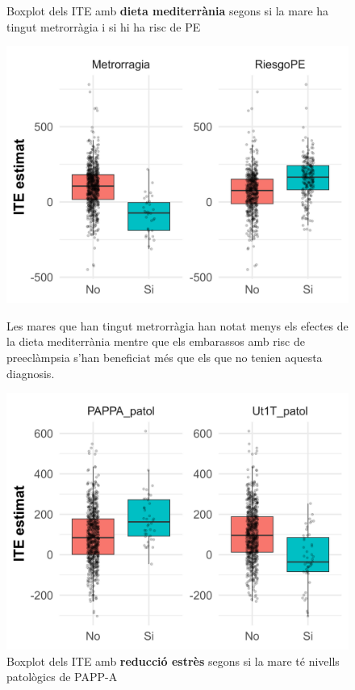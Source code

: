 \documentclass[../main.tex]{subfiles}
\begin{document}
    \begin{figure}[!htb]
      \centering
      \begin{minipage}[t]{0.48\textwidth}
        \captionsetup{font=small}
        \caption*{\centering Boxplot dels ITE amb \textbf{dieta mediterrània} segons si la mare ha tingut metrorràgia i si hi ha risc de PE}
        \includegraphics[width=\textwidth]{imgs/boxplots/boxplot_2_pes.jpg}
        \captionsetup{font=footnotesize}
        \caption{Les mares que han tingut metrorràgia han notat menys els efectes de la dieta mediterrània mentre que els embarassos amb risc de preeclàmpsia s'han beneficiat més que els que no tenien aquesta diagnosis.}
        \label{boxplot:pes2}
      \end{minipage}
      \hspace{0.01\textwidth}
      \begin{minipage}[t]{0.48\textwidth}
        \captionsetup{font=small}
        \caption*{\centering Boxplot dels ITE amb \textbf{reducció estrès} segons si la mare  té nivells patològics de PAPP-A}
        \includegraphics[width=\textwidth]{imgs/boxplots/boxplot_3_pes.jpg}

\end{minipage}
\end{figure}
\end{document}
